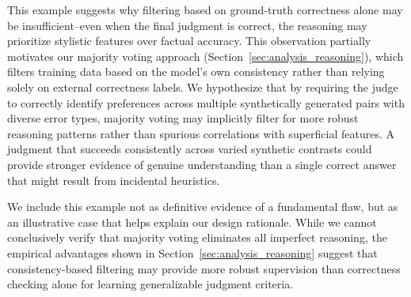 This example suggests why filtering based on ground-truth correctness alone may 
be insufficient--even when the final judgment is correct, the reasoning may 
prioritize stylistic features over factual accuracy. This observation partially 
motivates our majority voting approach (Section~\ref{sec:analysis_reasoning}), which filters training 
data based on the model's own consistency rather than relying solely on external 
correctness labels. We hypothesize that by requiring the judge to correctly 
identify preferences across multiple synthetically generated pairs with diverse 
error types, majority voting may implicitly filter for more robust reasoning 
patterns rather than spurious correlations with superficial features. A judgment 
that succeeds consistently across varied synthetic contrasts could provide 
stronger evidence of genuine understanding than a single correct answer that 
might result from incidental heuristics.

We include this example not as definitive evidence of a fundamental flaw, but 
as an illustrative case that helps explain our design rationale. While we cannot 
conclusively verify that majority voting eliminates all imperfect reasoning, 
the empirical advantages shown in Section~\ref{sec:analysis_reasoning} suggest that consistency-based 
filtering may provide more robust supervision than correctness checking alone 
for learning generalizable judgment criteria.
